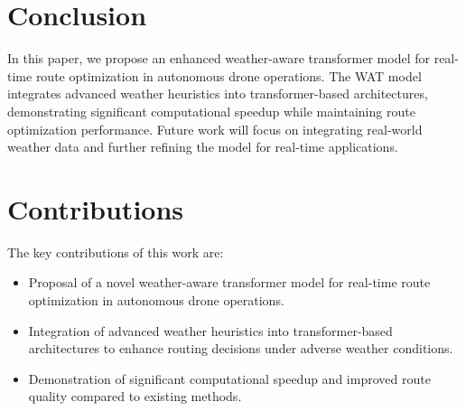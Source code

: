 \documentclass[11pt]{article}
\begin{document}
\section{Conclusion}

In this paper, we propose an enhanced weather-aware transformer model for real-time route optimization in autonomous drone operations. The WAT model integrates advanced weather heuristics into transformer-based architectures, demonstrating significant computational speedup while maintaining route optimization performance. Future work will focus on integrating real-world weather data and further refining the model for real-time applications.

\section{Contributions}

The key contributions of this work are:

\begin{itemize}
  \item Proposal of a novel weather-aware transformer model for real-time route optimization in autonomous drone operations.
  \item Integration of advanced weather heuristics into transformer-based architectures to enhance routing decisions under adverse weather conditions.
  \item Demonstration of significant computational speedup and improved route quality compared to existing methods.
\end{itemize}
\end{document}
